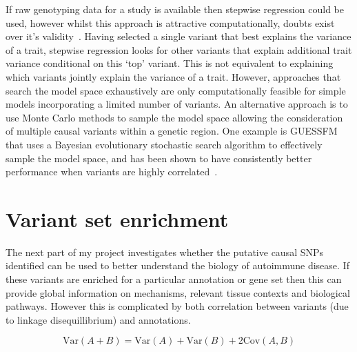 \documentclass[a4paper,11pt]{report}
\begin{document}
If raw genotyping data for a study is available then stepwise regression could be used, however whilst this approach is attractive computationally, doubts exist over it's validity~\citep{miller-1984}.  Having selected a single variant that best explains the variance of a trait, stepwise regression  looks for other variants that explain additional trait variance conditional on this `top' variant. This is not equivalent to explaining which variants jointly explain the variance of a trait. However, approaches that search the model space exhaustively are only computationally feasible for simple models incorporating a limited number of variants. An alternative approach is to use Monte Carlo methods to sample the model space allowing the consideration of multiple causal variants within a genetic region. One example is GUESSFM that uses a Bayesian evolutionary stochastic search algorithm to effectively sample the model space, and has been shown to have consistently better performance when variants are highly correlated~\cite{WallaceCutlerPontikosEtAl2015}. 

\section{Variant set enrichment}
\label{sect:vsea}
The next part of my project investigates whether the putative causal SNPs identified can be used to better understand the biology of autoimmune disease.  If these variants  are enriched for a particular annotation or gene set then this can provide global information on mechanisms, relevant tissue contexts and biological pathways. However this is complicated by both correlation between variants (due to linkage disequillibrium) and annotations. 

\begin{equation}
	\text{Var}(A + B) = \text{Var}(A) + \text{Var}(B) + 2\text{Cov}(A,B)
\end{equation}
\end{document}
